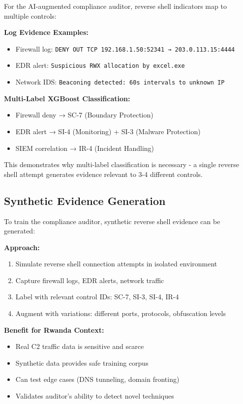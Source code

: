 \documentclass[11pt,conference]{IEEEtran}
\begin{document}
For the AI-augmented compliance auditor, reverse shell indicators map to multiple controls:

\textbf{Log Evidence Examples:}
\begin{itemize}
    \item Firewall log: \texttt{DENY OUT TCP 192.168.1.50:52341 → 203.0.113.15:4444}
    \item EDR alert: \texttt{Suspicious RWX allocation by excel.exe}
    \item Network IDS: \texttt{Beaconing detected: 60s intervals to unknown IP}
\end{itemize}

\textbf{Multi-Label XGBoost Classification:}
\begin{itemize}
    \item Firewall deny → SC-7 (Boundary Protection)
    \item EDR alert → SI-4 (Monitoring) + SI-3 (Malware Protection)
    \item SIEM correlation → IR-4 (Incident Handling)
\end{itemize}

This demonstrates why multi-label classification is necessary - a single reverse shell attempt generates evidence relevant to 3-4 different controls.

\subsection{Synthetic Evidence Generation}

To train the compliance auditor, synthetic reverse shell evidence can be generated:

\textbf{Approach:}
\begin{enumerate}
    \item Simulate reverse shell connection attempts in isolated environment
    \item Capture firewall logs, EDR alerts, network traffic
    \item Label with relevant control IDs: SC-7, SI-3, SI-4, IR-4
    \item Augment with variations: different ports, protocols, obfuscation levels
\end{enumerate}

\textbf{Benefit for Rwanda Context:}
\begin{itemize}
    \item Real C2 traffic data is sensitive and scarce
    \item Synthetic data provides safe training corpus
    \item Can test edge cases (DNS tunneling, domain fronting)
    \item Validates auditor's ability to detect novel techniques
\end{itemize}
\end{document}
